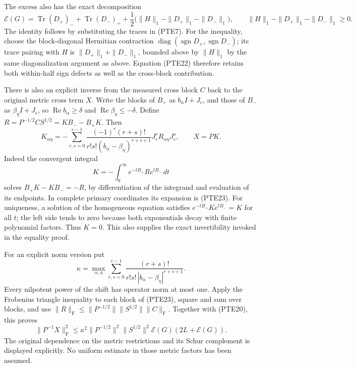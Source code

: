 The excess also has the exact decomposition
\begin{equation}\tag{PTE22}\label{eq:pte22}
 \mathcal E(G)=\operatorname{Tr}(D_+)_-
 +\operatorname{Tr}(D_-)_+
 +\frac12\bigl(\|H\|_1-\|D_+\|_1-\|D_-\|_1\bigr),
 \qquad \|H\|_1-\|D_+\|_1-\|D_-\|_1\geq0.
\end{equation}
The identity follows by substituting the traces in (PTE7).
For the inequality, choose the block-diagonal Hermitian contraction
\(\operatorname{diag}(\operatorname{sgn}D_+,
\operatorname{sgn}D_-)\); its trace pairing with \(H\) is
\(\|D_+\|_1+\|D_-\|_1\), bounded above by \(\|H\|_1\) by the
same diagonalization argument as above.  Equation (PTE22) therefore
retains both within-half sign defects as well as the cross-block
contribution.

There is also an explicit inverse from the measured cross block
\(C\) back to the original metric cross term \(X\).  Write the
blocks of \(B_+\) as \(b_\alpha I+J_e\), and those of \(B_-\) as
\(\beta_\eta I+J_e\), so
\(\operatorname{Re}b_\alpha\geq\delta\) and
\(\operatorname{Re}\beta_\eta\leq-\delta\).  Define
\(R=P^{-1/2}CS^{1/2}=KB_--B_+K\).  Then
\begin{equation}\tag{PTE23}\label{eq:pte23}
 K_{\alpha\eta}
 =-\sum_{r,s=0}^{e-1}
 \frac{(-1)^r(r+s)!}
 {r!s!(b_\alpha-\beta_\eta)^{r+s+1}}
 J_e^rR_{\alpha\eta}J_e^s,
 \qquad X=PK.
\end{equation}
Indeed the convergent integral
\[
 K=-\int_0^\infty e^{-tB_+}R e^{tB_-}\,dt
\]
solves \(B_+K-KB_-=-R\), by differentiation of the integrand and
evaluation of its endpoints.  In complete primary coordinates its
expansion is (PTE23).  For uniqueness, a solution of the homogeneous
equation satisfies
\(e^{-tB_+}Ke^{tB_-}=K\) for all \(t\); the left side tends to zero
because both exponentials decay with finite polynomial factors.
Thus \(K=0\).  This also supplies the exact invertibility invoked in
the equality proof.

For an explicit norm version put
\begin{equation}\tag{PTE24}\label{eq:pte24}
 \kappa=\max_{\alpha,\eta}
 \sum_{r,s=0}^{e-1}
 \frac{(r+s)!}{r!s!\,|b_\alpha-\beta_\eta|^{r+s+1}}.
\end{equation}
Every nilpotent power of the shift has operator norm at most one.
Apply the Frobenius triangle inequality to each block of (PTE23),
square and sum over blocks, and use
\(\|R\|_{\mathrm F}\leq\|P^{-1/2}\|\|S^{1/2}\|\|C\|_{\mathrm F}\).
Together with (PTE20), this proves
\begin{equation}\tag{PTE25}\label{eq:pte25}
 \|P^{-1}X\|_{\mathrm F}^2
 \leq\kappa^2\|P^{-1/2}\|^2\|S^{1/2}\|^2
 \mathcal E(G)(2L+\mathcal E(G)).
\end{equation}
The original dependence on the metric restrictions and its Schur
complement is displayed explicitly.  No uniform estimate in those
metric factors has been assumed.

